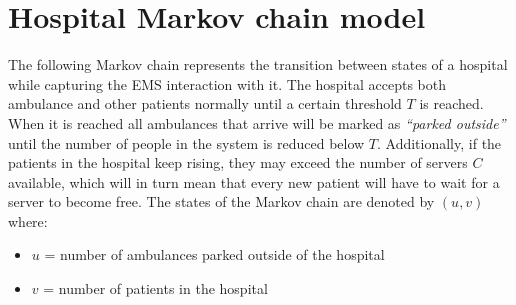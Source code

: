 \section{Hospital Markov chain model}
The following Markov chain represents the transition between states of a hospital while capturing the EMS interaction with it. The hospital accepts both ambulance and other patients normally until a certain threshold \(T\) is reached. When it is reached all ambulances that arrive will be marked as \textit{``parked outside''} until the number of people in the system is reduced below \(T\). Additionally, if the patients in the hospital keep rising, they may exceed the number of servers \(C\) available, which will in turn mean that every new patient will have to wait for a server to become free. The states of the Markov chain are denoted by \((u,v)\) where:

\begin{itemize}
    \item \(u\) = number of ambulances parked outside of the hospital
    \item \(v\) = number of patients in the hospital
\end{itemize}


